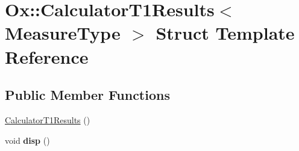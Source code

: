 \hypertarget{struct_ox_1_1_calculator_t1_results}{\section{Ox\-:\-:Calculator\-T1\-Results$<$ Measure\-Type $>$ Struct Template Reference}
\label{struct_ox_1_1_calculator_t1_results}
}
\subsection*{Public Member Functions}
\begin{DoxyCompactItemize}
\item 
\hyperlink{struct_ox_1_1_calculator_t1_results_a2ef9ec72b2f7e61bb442fe8e0f61d508}{Calculator\-T1\-Results} ()
\item 
\hypertarget{struct_ox_1_1_calculator_t1_results_a95930b2a41a0caf402b254deaad2353c}{void {\bfseries disp} ()}\label{struct_ox_1_1_calculator_t1_results_a95930b2a41a0caf402b254deaad2353c}

\end{DoxyCompactItemize}
